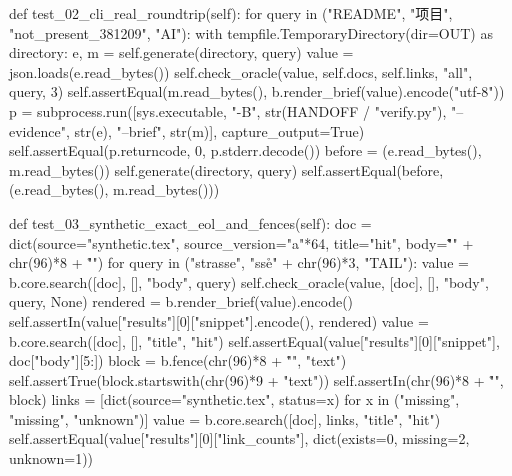     def test_02_cli_real_roundtrip(self):
        for query in ("README", "项目", "not_present_381209", "AI"):
            with tempfile.TemporaryDirectory(dir=OUT) as directory:
                e, m = self.generate(directory, query)
                value = json.loads(e.read_bytes())
                self.check_oracle(value, self.docs, self.links, "all", query, 3)
                self.assertEqual(m.read_bytes(), b.render_brief(value).encode("utf-8"))
                p = subprocess.run([sys.executable, "-B", str(HANDOFF / "verify.py"),
                                    "--evidence", str(e), "--brief", str(m)], capture_output=True)
                self.assertEqual(p.returncode, 0, p.stderr.decode())
                before = (e.read_bytes(), m.read_bytes())
                self.generate(directory, query)
                self.assertEqual(before, (e.read_bytes(), m.read_bytes()))

    def test_03_synthetic_exact_eol_and_fences(self):
        doc = dict(source="synthetic.tex", source_version="a"*64, title="hit",
                   body="\r\n \r{}\r\n" + chr(96)*8 + "\r\nTAIL")
        for query in ("strasse", "sse\r\n" + chr(96)*3, "TAIL"):
            value = b.core.search([doc], [], "body", query)
            self.check_oracle(value, [doc], [], "body", query, None)
            rendered = b.render_brief(value).encode()
            self.assertIn(value["results"][0]["snippet"].encode(), rendered)
        value = b.core.search([doc], [], "title", "hit")
        self.assertEqual(value["results"][0]["snippet"], doc["body"][5:])
        block = b.fence(chr(96)*8 + "\r\nTAIL", "text")
        self.assertTrue(block.startswith(chr(96)*9 + "text\n"))
        self.assertIn(chr(96)*8 + "\r\nTAIL\n", block)
        links = [dict(source="synthetic.tex", status=x) for x in ("missing", "missing", "unknown")]
        value = b.core.search([doc], links, "title", "hit")
        self.assertEqual(value["results"][0]["link_counts"], dict(exists=0, missing=2, unknown=1))

